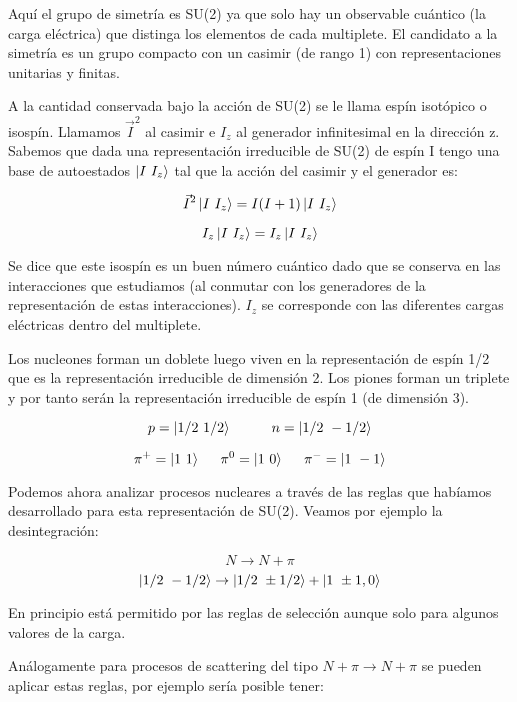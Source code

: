 \documentclass{article}
\begin{document}
        \smallskip
        Aquí el grupo de simetría es SU(2) ya que solo hay un observable cuántico (la carga eléctrica) que distinga los elementos de cada multiplete. El candidato a la simetría es un grupo compacto con un casimir (de rango 1) con representaciones unitarias y finitas.

        \smallskip
        A la cantidad conservada bajo la acción de SU(2) se le llama espín isotópico o isospín. Llamamos $\Vec{I}^2$ al casimir e $I_z$ al generador infinitesimal en la dirección z. Sabemos que dada una representación irreducible de SU(2) de espín I tengo una base de autoestados $\ket{I \ I_z}$ tal que la acción del casimir y el generador es:

        $$\Vec{I}^2 \ket{I \ I_z} = I(I+1)\ket{I \ I_z}$$

        $$I_z \ket{I \ I_z} = I_z \ket{I \ I_z}$$

        Se dice que este isospín es un buen número cuántico dado que se conserva en las interacciones que estudiamos (al conmutar con los generadores de la representación de estas interacciones). $I_z$ se corresponde con las diferentes cargas eléctricas dentro del multiplete.

        \smallskip
        Los nucleones forman un doblete luego viven en la representación de espín 1/2 que es la representación irreducible de dimensión 2. Los piones forman un triplete y por tanto serán la representación irreducible de espín 1 (de dimensión 3).

        $$p=\ket{1/2 \ 1/2} \hspace{1cm} n=\ket{1/2 \ -1/2}$$

        $$\pi^+ = \ket{1 \ 1} \hspace{0.5cm} \pi^0 = \ket{1 \ 0} \hspace{0.5cm} \pi^- = \ket{1 \ -1} $$

        Podemos ahora analizar procesos nucleares a través de las reglas que habíamos desarrollado para esta representación de SU(2). Veamos por ejemplo la desintegración:

        $$N \to N + \pi$$
        $$\ket{1/2 \ -1/2} \to \ket{1/2 \ \pm 1/2} + \ket{1 \ \pm 1,0}$$

        En principio está permitido por las reglas de selección aunque solo para algunos valores de la carga.

        \smallskip
        Análogamente para procesos de scattering del tipo $N+\pi \to N + \pi$ se pueden aplicar estas reglas, por ejemplo sería posible tener:
\end{document}
